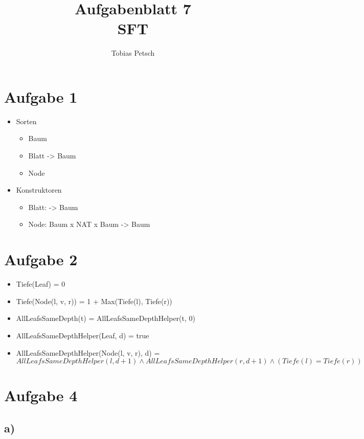 \documentclass[a4paper,12pt]{article}
\title{Aufgabenblatt 7\\\large SFT}
\author{Tobias Petsch}
\date{}
\begin{document}
\maketitle

\section*{Aufgabe 1}

\begin{itemize}
    \item Sorten
    \begin{itemize}
        \item Baum
        \item Blatt -> Baum 
        \item Node
    \end{itemize}
    \item Konstruktoren
    \begin{itemize}
        \item Blatt: -> Baum
        \item Node: Baum x NAT x Baum -> Baum
    \end{itemize}
\end{itemize}

\section*{Aufgabe 2}

\begin{itemize}
    \item Tiefe(Leaf) = 0
    \item Tiefe(Node(l, v, r)) = 1 + Max(Tiefe(l), Tiefe(r))
    \item AllLeafsSameDepth(t) = AllLeafsSameDepthHelper(t, 0)
    \item AllLeafsSameDepthHelper(Leaf, d) = true
    \item AllLeafsSameDepthHelper(Node(l, v, r), d) = $AllLeafsSameDepthHelper(l, d + 1) \land AllLeafsSameDepthHelper(r, d + 1) \land (Tiefe(l) = Tiefe(r))$
\end{itemize}

\section*{Aufgabe 4}

\subsection*{a)}
\end{document}
